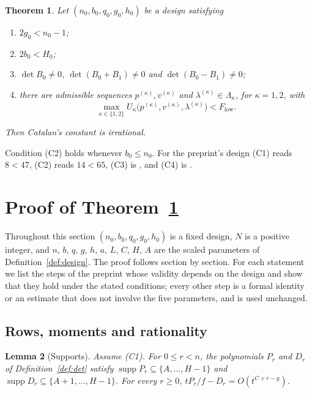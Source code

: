\documentclass[11pt]{article}
\newtheorem{theorem}{Theorem}
\newtheorem{lemma}[theorem]{Lemma}
\theoremstyle{definition}
\begin{document}
\begin{theorem}\label{thm:main}
Let $(n_0,b_0,q_0,g_0,h_0)$ be a design satisfying
\begin{enumerate}
\item[(C1)] $2g_0<n_0-1$;
\item[(C2)] $2b_0<H_0$;
\item[(C3)] $\det B_0\ne0$, $\det(B_0+B_1)\ne0$ and $\det(B_0-B_1)\ne0$;
\item[(C4)] there are admissible sequences $p^{(\kappa)},v^{(\kappa)}$ and $\lambda^{(\kappa)}\in\Lambda_\kappa$, for $\kappa=1,2$, with
\[
\max_{\kappa\in\{1,2\}}U_\kappa\big(p^{(\kappa)},v^{(\kappa)},\lambda^{(\kappa)}\big)<F_{\mathrm{low}} .
\]
\end{enumerate}
Then Catalan's constant is irrational.
\end{theorem}

Condition (C2) holds whenever $b_0\le n_0$. For the preprint's design (C1) reads $8<47$, (C2) reads $14<65$, (C3) is \cite[Eq.~(48)]{OAI}, and (C4) is \cite[Props.~3.4 and 7.1]{OAI}.

\section{Proof of Theorem~\ref{thm:main}}\label{sec:proof}

Throughout this section $(n_0,b_0,q_0,g_0,h_0)$ is a fixed design, $N$ is a positive integer, and $n$, $b$, $q$, $g$, $h$, $a$, $L$, $C$, $H$, $A$ are the scaled parameters of Definition~\ref{def:design}. The proof follows \cite{OAI} section by section. For each statement we list the steps of the preprint whose validity depends on the design and show that they hold under the stated conditions; every other step is a formal identity or an estimate that does not involve the five parameters, and is used unchanged.

\subsection{Rows, moments and rationality}

\begin{lemma}[Supports]\label{lem:supports}
Assume (C1). For $0\le r<n$, the polynomials $P_r$ and $D_r$ of Definition~\ref{def:det} satisfy $\operatorname{supp}P_r\subseteq\{A,\dots,H-1\}$ and $\operatorname{supp}D_r\subseteq\{A+1,\dots,H-1\}$. For every $r\ge0$, $tP_r/f-D_r=O(t^{C+r-g})$.
\end{lemma}
\end{document}
